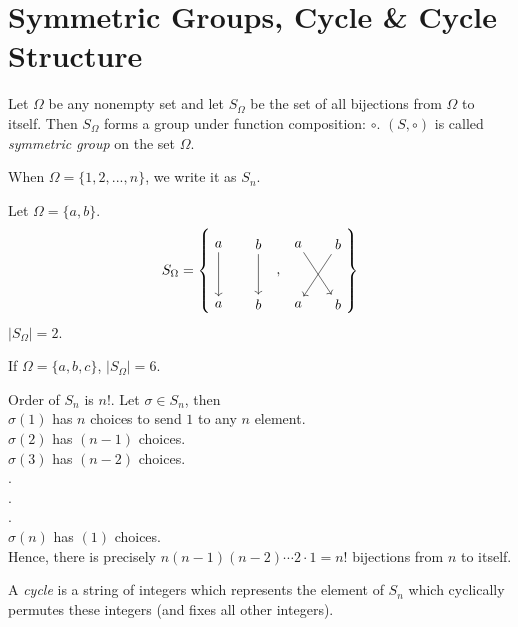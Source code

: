 \section{Symmetric Groups, Cycle \& Cycle Structure}
\begin{definition}
    Let $\Omega$ be any nonempty set and let $S_\Omega$ be the set of all bijections from $\Omega$ to itself. Then $S_{\Omega}$ forms a group under function composition: $\circ$. $(S, \circ)$ is called \textit{symmetric group} on the set $\Omega$.
\end{definition}
When $\Omega = \{1, 2, ..., n\}$, we write it as $S_n$. 
\begin{eg}
    Let $\Omega = \{a, b\}$.
    \[
S_\Omega = 
    \left\{
    \begin{tikzpicture}[baseline={(current bounding box.center)}]
        \node (a) at (0,0) {$a$};
        \node (b) at (1,0) {$b$};
        \node (a1) at (0,-1.5) {$a$};
        \node (b1) at (1,-1.5) {$b$};
        \draw[->] (a) -- (a1);
        \draw[->] (b) -- (b1);

        \node (c) at (1.5, -0.75) {$,$};
        \node (a) at (2,0) {$a$};
        \node (b) at (3,0) {$b$};
        \node (a1) at (2,-1.5) {$a$};
        \node (b1) at (3,-1.5) {$b$};
        \draw[->] (a) -- (b1);
        \draw[->] (b) -- (a1);
    \end{tikzpicture}
    \right\}
    \]
    $|S_\Omega| = 2.$
\end{eg}
\begin{eg}
    If $\Omega = \{a, b, c\}$, $|S_\Omega| = 6.$
\end{eg}
Order of $S_n$ is $n!$. Let $\sigma \in S_n$, then\\
$\sigma(1)$ has $n$ choices to send $1$ to any $n$ element.\\
$\sigma(2)$ has $(n-1)$ choices.\\
$\sigma(3)$ has $(n-2)$ choices.\\
.\\
.\\
.\\
$\sigma(n)$ has $(1)$ choices.\\
Hence, there is precisely $n(n-1)(n-2)\cdots2\cdot1 = n!$ bijections from $n$ to itself.\\
\begin{definition}
    A \textit{cycle} is a string of integers which represents the element of $S_n$ which cyclically permutes these integers (and fixes all other integers). 
\end{definition}
